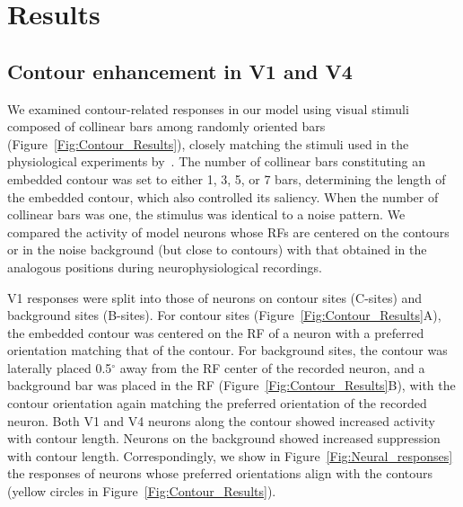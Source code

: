 \section{Results}
\label{sec:results}

\subsection{Contour enhancement in V1 and V4}
We examined contour-related responses in our model using visual
stimuli composed of collinear bars among randomly oriented bars
(Figure~\ref{Fig:Contour_Results}), closely matching the stimuli used
in the physiological experiments by~\cite{Chen_etal14}. The number of
collinear bars constituting an embedded contour was set to either 1,
3, 5, or 7 bars, determining the length of the embedded contour, which
also controlled its saliency.  When the number of collinear bars was
one, the stimulus was identical to a noise pattern. We compared the
activity of model neurons whose RFs are centered on the contours or in
the noise background (but close to contours) with that obtained in the
analogous positions during neurophysiological recordings.

V1 responses were split into those of neurons on contour sites
(C-sites) and background sites (B-sites). For contour sites
(Figure~\ref{Fig:Contour_Results}A), the embedded contour was centered
on the RF of a neuron with a preferred orientation matching that of
the contour. For background sites, the contour was laterally placed
0.5$^{\circ}$ away from the RF center of the recorded neuron, and a
background bar was placed in the RF
(Figure~\ref{Fig:Contour_Results}B), with the contour orientation
again matching the preferred orientation of the recorded neuron.
Both V1 and V4 neurons along the contour showed increased activity with contour length. Neurons on the background showed increased suppression with contour length.
Correspondingly, we show in Figure~\ref{Fig:Neural_responses} the
responses of neurons whose preferred orientations align with the
contours (yellow circles in Figure~\ref{Fig:Contour_Results}).

